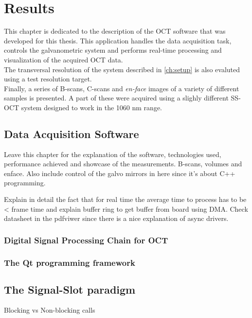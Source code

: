 
\chapter{Results} %
\label{ch:results} %

This chapter is dedicated to the description of the OCT software that was developed for this thesis. This application handles the data acquisition task, controls the galvanometric system and performs real-time processing and visualization of the acquired OCT data. \\

\noindent The transversal resolution of the system described in \autoref{ch:setup} is also evaluted using a test resolution target. \\

\noindent Finally, a series of B-scans, C-scans and \emph{en-face} images of a variety of different samples is presented. A part of these were acquired using a slighly different SS-OCT system designed to work in the 1060 nm range. 



\section{Data Acquisition Software}
Leave this chapter for the explanation of the software, technologies used, performance achieved and showcase of the measurements. B-scans, volumes and enface. Also include control of the galvo mirrors in here since it's about C++ programming. 

Explain in detail the fact that for real time the average time to process has to be < frame time and explain buffer ring to get buffer from board using DMA. Check datasheet in the pdfviwer since there is a nice explanation of async drivers. 


\subsection{Digital Signal Processing Chain for OCT}

\subsection{The Qt programming framework}
	\section{The Signal-Slot paradigm}
    Blocking vs Non-blocking calls

